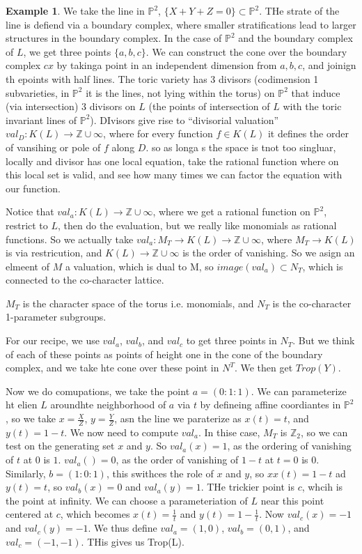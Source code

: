 \documentclass[12pt]{memoir}
\theoremstyle{definition}
\newtheorem{protoexample}{Example}[section]
\newenvironment{ex}
   {\begin{protoexample}}
   {\end{protoexample}}
\def\ZZ{{\mathbb Z}}
\def\PP{{\mathbb P}}
\begin{document}
\begin{ex}
    We take the line in $\PP^2$, $\{X+Y+Z=0\} \subset \PP^2$. THe strate of the line is defiend via a boundary complex, where smaller stratifications lead to larger structures in the boundary complex. In the case of $\PP^2$ and the boundary complex of $L$, we get three points $\{a,b,c\}$. We can construct the cone over the boundary complex $cx$ by takinga  point in an independent dimension from $a,b,c$, and joinign th epoints with half lines. The toric variety has 3 divisors (codimension 1 subvarieties, in $\PP^2$ it is the lines, not lying within the torus) on $\PP^2$ that induce (via intersection) 3 divisors on $L$ (the points of intersection of $L$ with the toric invariant lines of $\PP^2$). DIvisors give rise to ``divisorial valuation'' $val_D:K(L) \rightarrow \ZZ \cup \infty$, where for every function $f\in K(L)$ it defines the order of vansihing or pole of $f$ along $D$. so as longa s the space is tnot too singluar, locally and divisor has one local equation, take the rational function where on this local set is valid, and see how many times we can factor the equation with our function.


    Notice that $val_a:K(L) \rightarrow \ZZ\cup \infty$, where we get a rational function on $\PP^2$, restrict to $L$, then do the evaluation, but we really like monomials as rational functions. So we actually take $val_a:M _T\rightarrow K(L) \rightarrow \ZZ\cup \infty$, where $M_T \rightarrow K(L)$ is via restricution, and $K(L) \rightarrow \ZZ \cup \infty$ is the order of vanishing. So we asign an elmeent of $M$ a valuation, which is dual to M, so $image(val_a) \subset N_T$, which is connected to the co-character lattice.

    $M_T$ is the character space of the torus i.e. monomials, and $N_T$ is the co-character 1-parameter subgroups.

    For our recipe, we use $val_a$, $val_b$, and $val_c$ to get three points in $N_T$. But we think of each of these points as points of height one in the cone of the boundary complex, and we take hte cone over these point in $N^T$. We then get $Trop(Y)$. 



    Now we do comupations, we take the point $a=(0:1:1)$. We can parameterize ht elien $L$ aroundhte neighborhood of $a$ via $t$ by defineing affine coordiantes in $\PP^2$, so we take $x = \frac{X}{Z}$, $y= \frac{Y}{Z}$, asn the line we paraterize as $x(t)=t$, and $y(t) =1-t$. We now need to compute $val_a$. In thise case, $M_T$ is $\ZZ_2$, so we can test on the generating set $x$ and $y$. So $val_a(x)=1$, as the ordering of vanishing of $t$ at $0$ is $1$. $val_a()=0$, as the order of vanishing of $1-t$ at $t=0$ is $0$. Similarly, $b=(1:0:1)$, this swithces the role of $x$ and $y$, so $xx(t) = 1-t$ ad $y(t)=t$, so $val_b(x)=0$ and $val_a(y)=1$. THe trickier point is $c$, whcih is the point at infinity. We can choose a parameteriation of $L$ near this point centered at $c$, which becomes $x(t)=\frac{1}{t}$ and $y(t) = 1-\frac{1}{t}$. Now $val_c(x)=-1$ and $val_c(y)=-1$. We thus define $val_a=(1,0)$, $val_b=(0,1)$, and $val_c=(-1,-1)$. THis gives us Trop(L). 


\end{ex}
\end{document}
